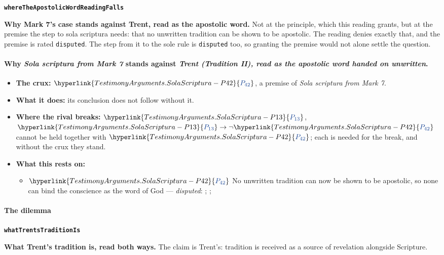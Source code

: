 \documentclass[11pt]{article}
\newcommand{\pvar}[2]{\hyperlink{#1-P#2}{\textcolor{claimlink}{P_{#2}}}}
\begin{document}
\par\medskip\noindent\textbf{\texttt{where\allowbreak{}The\allowbreak{}Apostolic\allowbreak{}Word\allowbreak{}Reading\allowbreak{}Falls}}\par\nobreak\noindent
\textbf{Why Mark 7’s case stands against Trent, read as the apostolic word.} Not at the principle, which this reading grants, but at the premise the step to sola scriptura needs: that no unwritten tradition can be shown to be apostolic. The reading denies exactly that, and the premise is rated \texttt{disputed}. The step from it to the sole rule is \texttt{disputed} too, so granting the premise would not alone settle the question.

\paragraph{Why \emph{Sola scriptura from Mark 7} stands against \emph{Trent (Tradition II), read as the apostolic word handed on unwritten}.}
\begin{itemize}
\item \textbf{The crux:} \(\pvar{TestimonyArguments.SolaScriptura}{42}\), a premise of \emph{Sola scriptura from Mark 7}.
\item \textbf{What it does:} its conclusion does not follow without it.
\item \textbf{Where the rival breaks:} \(\pvar{TestimonyArguments.SolaScriptura}{13}\), \(\pvar{TestimonyArguments.SolaScriptura}{13} \rightarrow \lnot \pvar{TestimonyArguments.SolaScriptura}{42}\) cannot be held together with \(\pvar{TestimonyArguments.SolaScriptura}{42}\); each is needed for the break, and without the crux they stand.
\item \textbf{What this rests on:}
\begin{itemize}
\item \(\pvar{TestimonyArguments.SolaScriptura}{42}\) No unwritten tradition can now be shown to be apostolic, so none can bind the conscience as the word of God --- \emph{disputed}: \cite[503--511]{whitaker-disputation-1849}; \cite[594]{whitaker-disputation-1849}; \cite[I.6]{westminster-confession-1647}
\end{itemize}
\end{itemize}
\paragraph*{The dilemma}
\leavevmode\par\nobreak
\par\medskip\noindent\textbf{\texttt{what\allowbreak{}Trents\allowbreak{}Tradition\allowbreak{}Is}}\par\nobreak\noindent
\textbf{What Trent’s tradition is, read both ways.} The claim is Trent’s: tradition is received as a source of revelation alongside Scripture.
\end{document}

